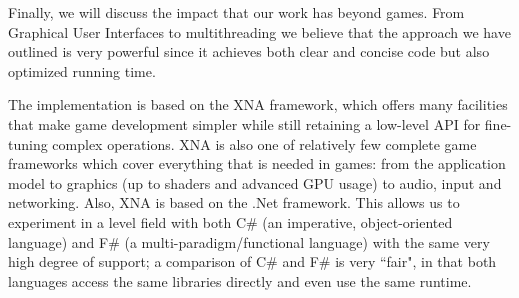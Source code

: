 Finally, we will discuss the impact that our work has beyond games. From Graphical User Interfaces to multithreading we believe that the approach we have outlined is very powerful since it achieves both clear and concise code but also optimized running time.

The implementation is based on the XNA framework, which offers many facilities that make game development simpler while still retaining a low-level API for fine-tuning complex operations. XNA is also one of relatively few complete game frameworks which cover everything that is needed in games: from the application model to graphics (up to shaders and advanced GPU usage) to audio, input and networking. Also, XNA is based on the .Net framework. This allows us to experiment in a level field with both C\# (an imperative, object-oriented language) and F\# (a multi-paradigm/functional language) with the same very high degree of support; a comparison of C\# and F\# is very ``fair", in that both languages access the same libraries directly and even use the same runtime.

